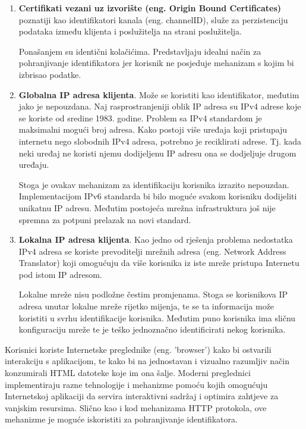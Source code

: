 \documentclass[times, utf8, zavrsni]{fer}
\begin{document}
\begin{enumerate}
  \item \textbf{Certifikati vezani uz izvorište (eng. Origin Bound
      Certificates)} poznatiji kao identifikatori kanala (eng. channelID), služe
    za perzistenciju podataka između klijenta i poslužitelja na strani
    poslužitelja.

    Ponašanjem su identični kolačićima. Predstavljaju idealni način za
    pohranjivanje identifikatora jer korisnik ne posjeduje mehanizam s kojim bi
    izbrisao podatke.

  \item \textbf{Globalna IP adresa klijenta}. Može se koristiti kao
    identifikator, međutim jako je nepouzdana. Naj rasprostranjeniji oblik IP
    adresa su IPv4 adrese koje se koriste od sredine 1983. godine. Problem sa
    IPv4 standardom je maksimalni mogući broj adresa. Kako postoji više uređaja
    koji pristupaju internetu nego slobodnih IPv4 adresa, potrebno je
    reciklirati adrese. Tj. kada neki uređaj ne koristi njemu dodijeljenu IP
    adresu ona se dodjeljuje drugom uređaju.

    Stoga je ovakav mehanizam za identifikaciju korisnika izrazito nepouzdan.
    Implementacijom IPv6 standarda bi bilo moguće svakom korisniku dodijeliti
    unikatnu IP adresu. Međutim postojeća mrežna infrastruktura još nije spremna
    za potpuni prelazak na novi standard.

  \item \textbf{Lokalna IP adresa klijenta}. Kao jedno od rješenja problema
    nedostatka IPv4 adresa se koriste prevoditelji mrežnih adresa (eng.
    Network Address Translator) koji omogućuju da više korisnika iz iste mreže
    pristupa Internetu pod istom IP adresom.

    Lokalne mreže nisu podložne čestim promjenama. Stoga se korisnikova IP
    adresa unutar lokalne mreže rijetko mijenja, te se ta informacija može
    koristiti u svrhu identifikacije korisnika. Međutim puno korisnika ima
    sličnu konfiguraciju mreže te je teško jednoznačno identificirati nekog
    korisnika.

\end{enumerate}

Korisnici koriste Internetske preglednike (eng. 'browser') kako bi ostvarili
interakciju s aplikacijom, te kako bi na jednostavan i vizualno razumljiv način
konzumirali HTML datoteke koje im ona šalje. Moderni preglednici implementiraju
razne tehnologije i mehanizme pomoću kojih omogućuju Internetskoj aplikaciji da
servira interaktivni sadržaj i optimira zahtjeve za vanjskim resursima. Slično
kao i kod mehanizama HTTP protokola, ove mehanizme je moguće iskoristiti za
pohranjivanje identifikatora.
\end{document}
